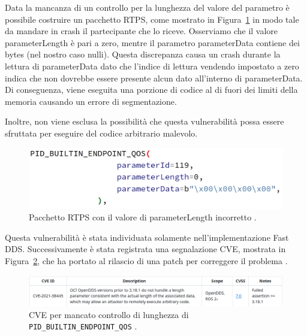 Data la mancanza di un controllo per la lunghezza del 
valore del parametro è possibile costruire un pacchetto 
RTPS, come mostrato in Figura~\ref{crashnode} 
in modo tale da 
mandare in crash il partecipante che lo riceve. 
Osserviamo che il valore parameterLength è pari a zero,
mentre il parametro parameterData contiene dei bytes 
(nel nostro caso nulli).
Questa discrepanza causa un crash durante la 
lettura di parameterData dato che l'indice di lettura 
vendendo impostato a zero indica che non dovrebbe essere 
presente alcun dato all'interno di parameterData. 
Di conseguenza,
viene eseguita una porzione di codice al di fuori dei 
limiti della memoria causando un errore di segmentazione.

Inoltre, 
non viene esclusa la possibilità che questa vulnerabilità 
possa essere sfruttata per eseguire del codice arbitrario 
malevolo.

\begin{figure}[H]
    \centering
    \includegraphics[width=15.2cm, keepaspectratio]{img/crashnode.png}
    \caption{Pacchetto RTPS con il valore di parameterLength incorretto 
    \cite{mayoral2022robot}.}
    \label{crashnode}
\end{figure}


Questa vulnerabilità è stata individuata solamente 
nell'implementazione Fast DDS.
Successivamente 
è stata registrata una segnalazione CVE, mostrata in 
Figura~\ref{CVEnodecrashing},
che ha portato 
al rilascio di una patch per correggere il problema \cite{mayoral2022robot}.


\begin{figure}[H]
    \centering
    \includegraphics[width=15.2cm, keepaspectratio]{img/CVE node crashing.png}
    \caption{CVE per mancato controllo di lunghezza 
    di \texttt{PID\_BUILTIN\_ENDPOINT\_QOS} \cite{mayoral2022robot}.}
    \label{CVEnodecrashing}
\end{figure}
